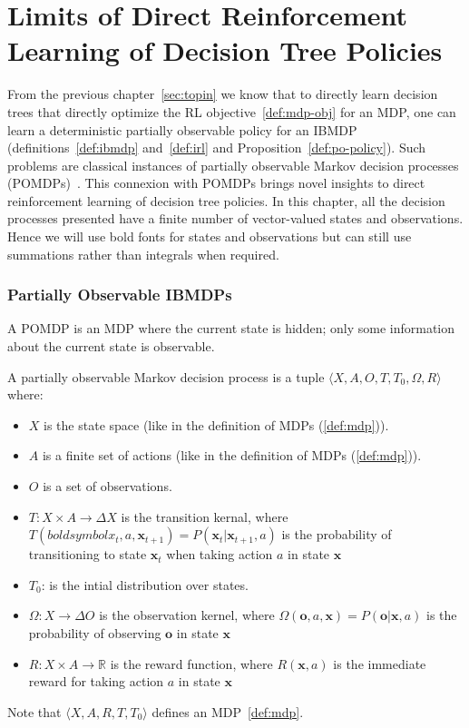 \chapter{Limits of Direct Reinforcement Learning of Decision Tree Policies}\label{sec:pomdp}

From the previous chapter~\ref{sec:topin} we know that to directly learn decision trees that directly optimize the RL objective~\ref{def:mdp-obj} for an MDP, one can learn a deterministic partially observable policy for an IBMDP (definitions~\ref{def:ibmdp} and~\ref{def:irl} and Proposition~\ref{def:po-policy}).
Such problems are classical instances of partially observable Markov decision processes (POMDPs)~\cite{POMDP,chap2}.
This connexion with POMDPs brings novel insights to direct reinforcement learning of decision tree policies. 
In this chapter, all the decision processes presented have a finite number of vector-valued states and observations.
Hence we will use bold fonts for states and observations but can still use summations rather than integrals when required.

\subsection{Partially Observable IBMDPs}\label{sec:poibmdp}
A POMDP is an MDP where the current state is hidden; only some information about the current state is observable.

\begin{definition}\label{def:pomdp}
A partially observable Markov decision process is a tuple $\langle X, A, O, T, T_0, \Omega, R\rangle$ where:
\begin{itemize}
    \item $X$ is the state space (like in the definition of MDPs (\ref{def:mdp})).
    \item $A$ is a finite set of actions (like in the definition of MDPs (\ref{def:mdp})).
    \item $O$ is a set of observations.
    \item $T: X \times A \rightarrow \Delta X$ is the transition kernal, where $T(boldsymbol{x}_t, a, \boldsymbol{x}_{t+1}) = P(\boldsymbol{x}_t|\boldsymbol{x}_{t+1}, a)$ is the probability of transitioning to state $\boldsymbol{x}_{t}$ when taking action $a$ in state $\boldsymbol{x}$
    \item $T_0$: is the intial distribution over states. 
    \item $\Omega: X \rightarrow \Delta O$ is the observation kernel, where $\Omega(\boldsymbol{o}, a, \boldsymbol{x}) = P(\boldsymbol{o}|\boldsymbol{x}, a)$ is the probability of observing $\boldsymbol{o}$ in state $\boldsymbol{x}$
    \item $R: X \times A \rightarrow \mathbb{R}$ is the reward function, where $R(\boldsymbol{x}, a)$ is the immediate reward for taking action $a$ in state $\boldsymbol{x}$
\end{itemize}
Note that $\langle X, A, R, T, T_0 \rangle$ defines an MDP~\ref{def:mdp}.
\end{definition}

